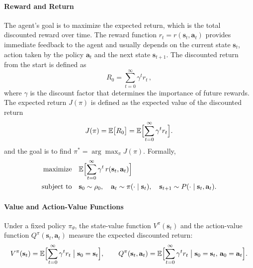 \paragraph{Reward and Return}
The agent's goal is to maximize the expected return, which is the total discounted reward over time. 
The reward function \(r_t=r(\mathbf{s}_t,\mathbf{a}_t)\) provides immediate feedback to the agent and usually depends on the current state \(\mathbf{s}_t\), action taken by the policy \(\mathbf{a}_t\) and the next state \(\mathbf{s}_{t+1}\). The discounted return from the start is defined as
\begin{equation}
R_0 = \sum_{t=0}^{\infty} \gamma^t r_t\,,
\end{equation}
where \(\gamma\) is the discount factor that determines the importance of future rewards. The expected return \(J(\pi)\) is defined as the expected value of the discounted return
\begin{equation}
J(\pi) = \mathbb{E}\bigl[R_0\bigr]
= \mathbb{E}\Bigl[\sum_{t=0}^\infty \gamma^t r_t\Bigr].
\end{equation}
and the goal is to find \(\pi^* = \arg\max_\pi J(\pi)\). Formally,
\begin{equation}\label{eq:RL_opt}
\begin{aligned}
\text{maximize} \quad & \mathbb{E}\Bigl[\sum_{t=0}^\infty \gamma^t\,r(\mathbf{s}_t,\mathbf{a}_t)\Bigr] \\
\text{subject to} \quad & \mathbf{s}_0 \sim \rho_0, \quad \mathbf{a}_t \sim \pi(\cdot\mid \mathbf{s}_t), \quad \mathbf{s}_{t+1} \sim P(\cdot\mid \mathbf{s}_t,\mathbf{a}_t).
\end{aligned}
\end{equation}

\paragraph{Value and Action-Value Functions}
Under a fixed policy \(\pi_\theta\), the state-value function \(V^\pi(\mathbf{s}_t)\) and the action-value function \(Q^\pi(\mathbf{s}_t,\mathbf{a}_t)\) measure the expected discounted return:
\begin{equation}
V^\pi(\mathbf{s}_t) = \mathbb{E}\Bigl[\sum_{t=0}^\infty \gamma^t r_t \;\big|\; \mathbf{s}_0 = \mathbf{s}_t\Bigr], 
\qquad
Q^\pi(\mathbf{s}_t,\mathbf{a}_t) = \mathbb{E}\Bigl[\sum_{t=0}^\infty \gamma^t r_t \;\big|\; \mathbf{s}_0 = \mathbf{s}_t,\,\mathbf{a}_0 = \mathbf{a}_t\Bigr].
\end{equation}

